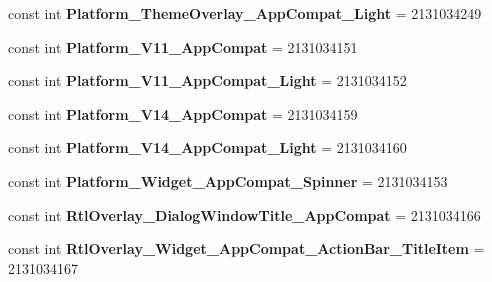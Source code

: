\begin{DoxyCompactItemize}
\item 
\hypertarget{classClient_1_1Droid_1_1Resource_1_1Style_a129ed7d02d3c50fec747a9c5f01bc1ff}{}const int {\bfseries Platform\+\_\+\+Theme\+Overlay\+\_\+\+App\+Compat\+\_\+\+Light} = 2131034249\label{classClient_1_1Droid_1_1Resource_1_1Style_a129ed7d02d3c50fec747a9c5f01bc1ff}

\item 
\hypertarget{classClient_1_1Droid_1_1Resource_1_1Style_a5f7cd3210857d313495bd00425c72ff6}{}const int {\bfseries Platform\+\_\+\+V11\+\_\+\+App\+Compat} = 2131034151\label{classClient_1_1Droid_1_1Resource_1_1Style_a5f7cd3210857d313495bd00425c72ff6}

\item 
\hypertarget{classClient_1_1Droid_1_1Resource_1_1Style_acf929052d6efda3a5ff913e3041d8991}{}const int {\bfseries Platform\+\_\+\+V11\+\_\+\+App\+Compat\+\_\+\+Light} = 2131034152\label{classClient_1_1Droid_1_1Resource_1_1Style_acf929052d6efda3a5ff913e3041d8991}

\item 
\hypertarget{classClient_1_1Droid_1_1Resource_1_1Style_a3684a8d0ace90e8770b75ed2528d73fa}{}const int {\bfseries Platform\+\_\+\+V14\+\_\+\+App\+Compat} = 2131034159\label{classClient_1_1Droid_1_1Resource_1_1Style_a3684a8d0ace90e8770b75ed2528d73fa}

\item 
\hypertarget{classClient_1_1Droid_1_1Resource_1_1Style_aa59d4dc9b5e57005af293d128be75061}{}const int {\bfseries Platform\+\_\+\+V14\+\_\+\+App\+Compat\+\_\+\+Light} = 2131034160\label{classClient_1_1Droid_1_1Resource_1_1Style_aa59d4dc9b5e57005af293d128be75061}

\item 
\hypertarget{classClient_1_1Droid_1_1Resource_1_1Style_ae7c193e0ff852e76b926ea6b53925186}{}const int {\bfseries Platform\+\_\+\+Widget\+\_\+\+App\+Compat\+\_\+\+Spinner} = 2131034153\label{classClient_1_1Droid_1_1Resource_1_1Style_ae7c193e0ff852e76b926ea6b53925186}

\item 
\hypertarget{classClient_1_1Droid_1_1Resource_1_1Style_a2434f4c8a0ed070e6aaae130b279041b}{}const int {\bfseries Rtl\+Overlay\+\_\+\+Dialog\+Window\+Title\+\_\+\+App\+Compat} = 2131034166\label{classClient_1_1Droid_1_1Resource_1_1Style_a2434f4c8a0ed070e6aaae130b279041b}

\item 
\hypertarget{classClient_1_1Droid_1_1Resource_1_1Style_a01c63fdae9ccdc8da675040c4fc6b071}{}const int {\bfseries Rtl\+Overlay\+\_\+\+Widget\+\_\+\+App\+Compat\+\_\+\+Action\+Bar\+\_\+\+Title\+Item} = 2131034167\label{classClient_1_1Droid_1_1Resource_1_1Style_a01c63fdae9ccdc8da675040c4fc6b071}


\end{DoxyCompactItemize}
